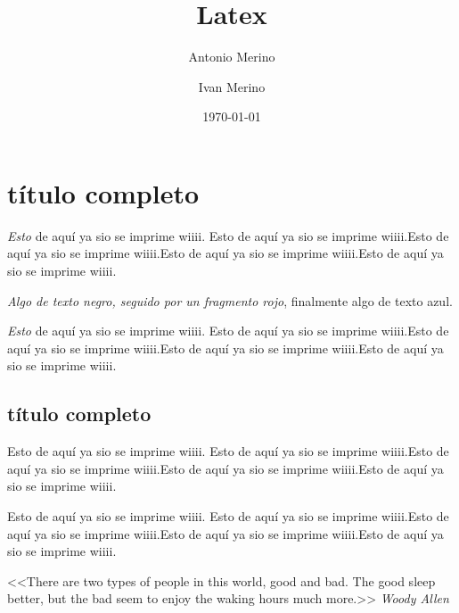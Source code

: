 \documentclass[a4paper, 12pt]{article}
\author{Antonio Merino \and Ivan Merino}
\title{Latex}
\date{\today}
\begin{document}
\maketitle


\section[título abreviado]{título completo}

\emph{Esto} de aquí ya sio se imprime wiiii. Esto de aquí ya sio se imprime wiiii.Esto de aquí ya sio se imprime wiiii.Esto de aquí ya sio se imprime wiiii.Esto de aquí ya sio se imprime wiiii.

\parskip =5mm

\emph{Algo de texto negro, \color{red} seguido por un fragmento rojo}, {\color {blue} finalmente algo de texto azul.}

{\color{db}\emph{Esto} de aquí ya sio se imprime wiiii. Esto de aquí ya sio se imprime wiiii.Esto de aquí ya sio se imprime wiiii.Esto de aquí ya sio se imprime wiiii.Esto de aquí ya sio se imprime wiiii.}


\subsection[título abreviado]{título completo}

Esto de aquí ya sio se imprime wiiii. Esto de aquí ya sio se imprime wiiii.Esto de aquí ya sio se imprime wiiii.Esto de aquí ya sio se imprime wiiii.Esto de aquí ya sio se imprime wiiii.

Esto de aquí ya sio se imprime wiiii. Esto de aquí ya sio se imprime wiiii.Esto de aquí ya sio se imprime wiiii.Esto de aquí ya sio se imprime wiiii.Esto de aquí ya sio se imprime wiiii.

\begin{center}
	<<There are two types of people in this world, good and bad. The good sleep better, but the bad seem to enjoy the waking hours much more.>>
	\emph{Woody Allen}
\end{center}
\end{document}
